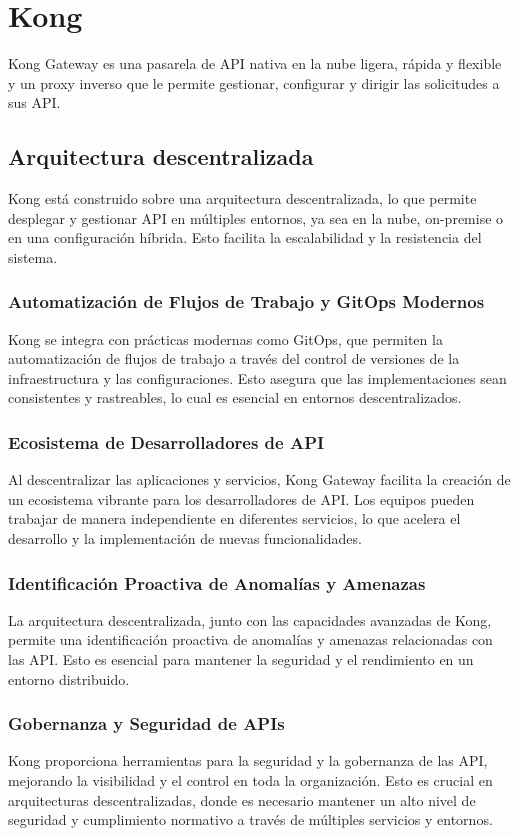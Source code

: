 \section{Kong}
Kong Gateway es una pasarela de API nativa en la nube ligera, rápida 
y flexible y un proxy inverso que le permite gestionar, configurar y 
dirigir las solicitudes a sus API. \cite{kong-api-gateway}

\subsection{Arquitectura descentralizada}
Kong está construido sobre una arquitectura descentralizada, 
lo que permite desplegar y gestionar API en múltiples entornos, 
ya sea en la nube, on-premise o en una configuración híbrida. 
Esto facilita la escalabilidad y la resistencia del sistema.


\subsubsection{Automatización de Flujos de Trabajo y GitOps Modernos}
Kong se integra con prácticas modernas como GitOps, que permiten la automatización de 
flujos de trabajo a través del control de versiones de la infraestructura y las configuraciones. 
Esto asegura que las implementaciones sean consistentes y rastreables, lo cual es esencial en entornos descentralizados.

\subsubsection{Ecosistema de Desarrolladores de API}
Al descentralizar las aplicaciones y servicios, Kong Gateway facilita la creación 
de un ecosistema vibrante para los desarrolladores de API. Los equipos pueden 
trabajar de manera independiente en diferentes servicios, lo que acelera el 
desarrollo y la implementación de nuevas funcionalidades.

\subsubsection{Identificación Proactiva de Anomalías y Amenazas}
La arquitectura descentralizada, junto con las capacidades avanzadas de Kong, 
permite una identificación proactiva de anomalías y amenazas 
relacionadas con las API. Esto es esencial para mantener 
la seguridad y el rendimiento en un entorno distribuido.

\subsubsection{Gobernanza y Seguridad de APIs}
Kong proporciona herramientas para la seguridad y la gobernanza de las API, 
mejorando la visibilidad y el control en toda la organización. 
Esto es crucial en arquitecturas descentralizadas, donde es necesario mantener un 
alto nivel de seguridad y cumplimiento normativo a través de múltiples servicios y entornos.


